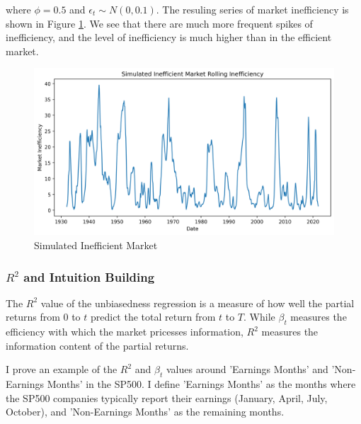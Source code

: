 where $\phi = 0.5$ and $\epsilon_t \sim N(0, 0.1)$. The resuling series of market inefficiency
 is shown in Figure \ref{fig:inefficient_market}. We see that there are much more frequent spikes of inefficiency, and the level of inefficiency is much higher than in the efficient market.

\begin{figure}[h]
    \centering
    \includegraphics[width=1\textwidth]{../figs/Simulated Inefficient Market Rolling Inefficiency.png}
    \caption{Simulated Inefficient Market}
    \label{fig:inefficient_market}
\end{figure}

\subsubsection{$R^2$ and Intuition Building}
The $R^2$ value of the unbiasedness regression is a measure of how well the partial returns from $0$ to $t$ predict the total return from $t$ to $T$.
While $\beta_t$ measures the efficiency with which the market pricesses information, $R^2$ measures the information content of the partial returns.

I prove an example of the $R^2$ and $\beta_t$ values around 'Earnings Months' and 'Non-Earnings Months' in the SP500. I define
'Earnings Months' as the months where the SP500 companies typically report their earnings (January, April, July, October), and 'Non-Earnings Months' as the remaining months.